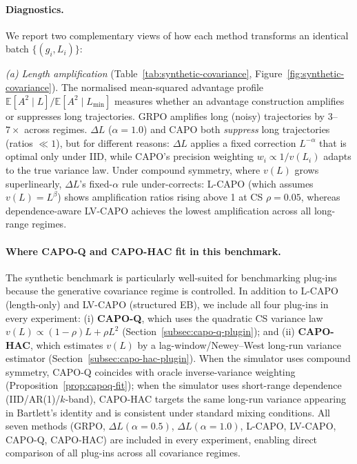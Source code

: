 \paragraph{Diagnostics.}
We report two complementary views of how each method transforms an identical batch $\{(g_i, L_i)\}$:

\noindent
\emph{(a) Length amplification} (Table~\ref{tab:synthetic-covariance}, Figure~\ref{fig:synthetic-covariance}).
The normalised mean-squared advantage profile $\mathbb{E}[A^2 \mid L] / \mathbb{E}[A^2 \mid L_{\min}]$ measures whether an advantage construction amplifies or suppresses long trajectories.
GRPO amplifies long (noisy) trajectories by $3$--$7\times$ across regimes.
$\Delta L$ ($\alpha = 1.0$) and CAPO both \emph{suppress} long trajectories (ratios $\ll 1$), but for different reasons:
$\Delta L$ applies a fixed correction $L^{-\alpha}$ that is optimal only under IID, while CAPO's precision weighting $w_i \propto 1/v(L_i)$ adapts to the true variance law.
Under compound symmetry, where $v(L)$ grows superlinearly, $\Delta L$'s fixed-$\alpha$ rule under-corrects: L-CAPO (which assumes $v(L) = L^{\beta}$) shows amplification ratios rising above 1 at CS $\rho = 0.05$, whereas dependence-aware LV-CAPO achieves the lowest amplification across all long-range regimes.

\paragraph{Where CAPO-Q and CAPO-HAC fit in this benchmark.}
The synthetic benchmark is particularly well-suited for benchmarking plug-ins because the generative covariance regime is controlled. In addition to L-CAPO (length-only) and LV-CAPO (structured EB), we include all four plug-ins in every experiment:
(i) \textbf{CAPO-Q}, which uses the quadratic CS variance law $v(L)\propto (1-\rho)L+\rho L^2$ (Section~\ref{subsec:capo-q-plugin}); and (ii) \textbf{CAPO-HAC}, which estimates $v(L)$ by a lag-window/Newey--West long-run variance estimator (Section~\ref{subsec:capo-hac-plugin}). When the simulator uses compound symmetry, CAPO-Q coincides with oracle inverse-variance weighting (Proposition~\ref{prop:capoq-fit}); when the simulator uses short-range dependence (IID/AR(1)/$k$-band), CAPO-HAC targets the same long-run variance appearing in Bartlett’s identity and is consistent under standard mixing conditions. All seven methods (GRPO, $\Delta L(\alpha{=}0.5)$, $\Delta L(\alpha{=}1.0)$, L-CAPO, LV-CAPO, CAPO-Q, CAPO-HAC) are included in every experiment, enabling direct comparison of all plug-ins across all covariance regimes.

